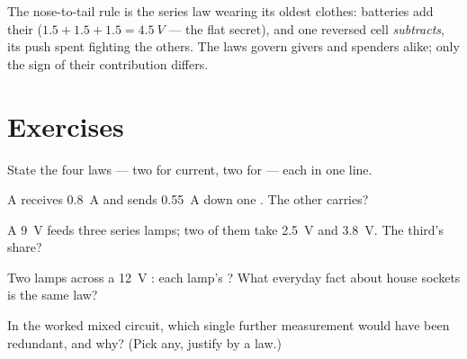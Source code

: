 \begin{remark}\label{rem:g8:circuit-laws:batteries}
The nose-to-tail rule is the series  law wearing its
oldest clothes: batteries  add their  ($1.5 +
1.5 + 1.5 = \qty{4.5}{V}$ --- the flat  secret), and
one reversed cell \emph{subtracts}, its push spent fighting
the others. The laws govern givers and spenders alike; only
the sign of their contribution differs.
\end{remark}

\section{Exercises}

\begin{exercise}[$\star$]\label{exo:g8:circuit-laws:1}
State the four laws --- two for current, two for  ---
each in one line.
\end{exercise}

\begin{exercise}[$\star$]\label{exo:g8:circuit-laws:2}
A  receives \qty{0.8}{A} and sends \qty{0.55}{A} down
one . The other  carries?
\end{exercise}

\begin{exercise}[$\star$]\label{exo:g8:circuit-laws:3}
A \qty{9}{V}  feeds three series lamps; two of them
take \qty{2.5}{V} and \qty{3.8}{V}. The third's share?
\end{exercise}

\begin{exercise}[$\star$]\label{exo:g8:circuit-laws:4}
Two lamps  across a \qty{12}{V} : each
lamp's ? What everyday fact about house sockets is the
same law?
\end{exercise}

\begin{exercise}[$\star$]\label{exo:g8:circuit-laws:5}
In the worked mixed circuit, which single further measurement
would have been redundant, and why? (Pick any, justify by a
law.)
\end{exercise}

